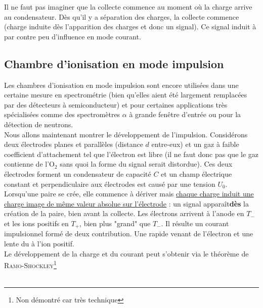 	Il ne faut pas imaginer que la collecte commence au moment où la charge arrive au condensateur.
	Dès qu'il y a séparation des charges, la collecte commence (charge induite dès l'apparition des
	charges et donc un signal). Ce signal induit à par contre peu d'influence en mode courant. 
	
	\subsection{Chambre d'ionisation en mode impulsion}		
	Les chambres d'ionisation en mode impulsion sont encore utilisées dans une certaine mesure en
	spectrométrie (bien qu'elles aient été largement remplacées par des détecteurs à 
	semiconducteur) et pour certaines applications très spécialisées comme des spectromètres $\alpha$
	à grande fenêtre d'entrée ou pour la détection de neutrons.\\
	
	Nous allons maintenant montrer le développement de l'impulsion. Considérons deux électrodes 
	planes et parallèles (distance $d$ entre-eux) et un gaz à faible coefficient d'attachement tel
	que l'électron est libre (il ne faut donc pas que le gaz contienne de l'O$_2$ sans quoi la forme
	du signal serait distordue). Ces deux électrodes forment un condensateur de capacité $C$ et un
	champ électrique constant et perpendiculaire aux électrodes est causé par une tension $U_0$.\\
	
	Lorsqu'une paire se crée, elle commence à dériver mais \underline{chaque charge induit une 
	charge image de même valeur absolue sur l'électrode} : un signal apparaît\textbf{dès} la création
	de la paire, bien avant la collecte. Les électrons arrivent à l'anode en $T_-$ et les ions 
	positifs en $T_+$, bien plus "grand" que $T_-$. Il résulte un courant impulsionnel formé de 
	deux contribution. Une rapide venant de l'électron et une lente du à l'ion positif.\\
	
	Le développement de la charge et du courant peut s'obtenir via le théorème de 
	\textsc{Ramo-Shockley}\footnote{Non démontré car très technique}\ \\
	
	\ \\
	
